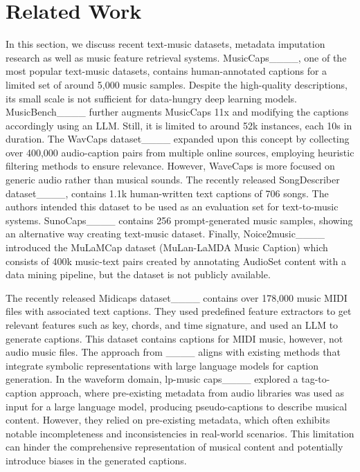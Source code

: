 \section{Related Work}
In this section, we discuss recent text-music datasets, metadata imputation research as well as music feature retrieval systems. MusicCaps____, one of the most popular text-music datasets, contains human-annotated captions for a limited set of around 5,000 music samples. Despite the high-quality descriptions, its small scale is not sufficient for data-hungry deep learning models. MusicBench____ further augments MusicCaps 11x and modifying the captions accordingly using an LLM. Still, it is limited to around 52k instances, each 10s in duration. The WavCaps dataset____ expanded upon this concept by collecting over 400,000 audio-caption pairs from multiple online sources, employing heuristic filtering methods to ensure relevance. However, WaveCaps is more focused on generic audio rather than musical sounds. The recently released SongDescriber dataset____, contains 1.1k human-written text captions of 706 songs. The authors intended this dataset to be used as an evaluation set for text-to-music systems. SunoCaps____ contains 256 prompt-generated music samples, showing an alternative way creating text-music dataset. Finally, Noice2music____ introduced the MuLaMCap dataset (MuLan-LaMDA Music Caption) which consists of 400k music-text pairs created by annotating AudioSet content with a data mining pipeline, but the dataset is not publicly available. 

The recently released Midicaps dataset____ contains over 178,000 music MIDI files with associated text captions. They used predefined feature extractors to get relevant features such as key, chords, and time signature, and used an LLM to generate captions. This dataset contains captions for MIDI music, however, not audio music files. The approach from  ____ aligns with existing methods that integrate symbolic representations with large language models for caption generation. In the waveform domain, lp-music caps____ explored a tag-to-caption approach, where pre-existing metadata from audio libraries was used as input for a large language model, producing pseudo-captions to describe musical content. However, they relied on pre-existing metadata, which often exhibits notable incompleteness and inconsistencies in real-world scenarios. This limitation can hinder the comprehensive representation of musical content and potentially introduce biases in the generated captions.

